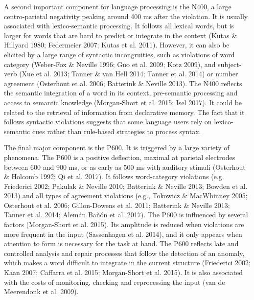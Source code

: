 \documentclass[11pt]{article}
\newenvironment{styleStandard}{\renewcommand\baselinestretch{1.0}\setlength\leftskip{0cm}\setlength\rightskip{0cm plus 1fil}\setlength\parindent{0cm}\setlength\parfillskip{0pt plus 1fil}\setlength\parskip{0in plus 1pt}\writerlistparindent\writerlistleftskip\leavevmode\normalfont\normalsize\writerlistlabel\ignorespaces}{\unskip\vspace{0.111in plus 0.0111in}\par}
\newcommand\writerlistleftskip{}
\newcommand\writerlistparindent{}
\newcommand\writerlistlabel{}
\begin{document}
\begin{styleStandard}
A second important component for language processing is the N400, a large centro-parietal negativity peaking around 400 ms after the violation. It is usually associated with lexico-semantic processing. It follows all lexical words, but is larger for words that are hard to predict or integrate in the context (Kutas \& Hillyard 1980; Federmeier 2007; Kutas et al. 2011). However, it can also be elicited by a large range of syntactic incongruities, such as violations of word category (Weber-Fox \& Neville 1996; Guo et al. 2009; Kotz 2009), and subject-verb (Xue et al. 2013; Tanner \& van Hell 2014; Tanner et al. 2014) or number agreement (Osterhout et al. 2006; Batterink \& Neville 2013). The N400 reflects the semantic integration of a word in its context, pre-semantic processing and access to semantic knowledge (Morgan-Short et al. 2015; Isel 2017). It could be related to the retrieval of information from declarative memory. The fact that it follows syntactic violations suggests that some language users rely on lexico-semantic cues rather than rule-based strategies to process syntax. 
\end{styleStandard}

\begin{styleStandard}
The final major component is the P600. It is triggered by a large variety of phenomena. The P600 is a positive deflection, maximal at parietal electrodes between 600 and 900 ms, or as early as 500 ms with auditory stimuli (Osterhout \& Holcomb 1992; Qi et al. 2017). It follows word-category violations (e.g. Friederici 2002; Pakulak \& Neville 2010; Batterink \& Neville 2013; Bowden et al. 2013) and all types of agreement violations (e.g., Tokowicz \& MacWhinney 2005; Osterhout et al. 2006; Gillon-Dowens et al. 2011; Batterink \& Neville 2013; Tanner et al. 2014; Alemán Bañón et al. 2017). The P600 is influenced by several factors (Morgan-Short et al. 2015). Its amplitude is reduced when violations are more frequent in the input (Sassenhagen et al. 2014), and it only appears when attention to form is necessary for the task at hand. The P600 reflects late and controlled analysis and repair processes that follow the detection of an anomaly, which makes a word difficult to integrate in the current structure (Friederici 2002; Kaan 2007; Caffarra et al. 2015; Morgan-Short et al. 2015). It is also associated with the costs of monitoring, checking and reprocessing the input (van de Meerendonk et al. 2009).
\end{styleStandard}
\end{document}
